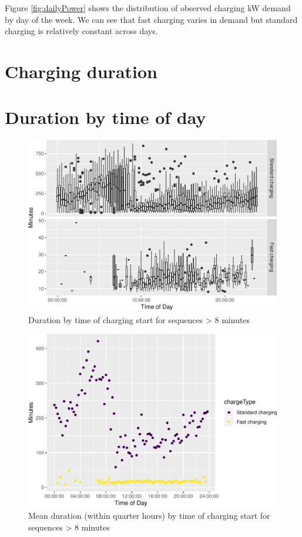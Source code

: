 \documentclass[]{article}
\begin{document}
Figure \ref{fig:dailyPower} shows the distribution of observed charging
kW demand by day of the week. We can see that fast charging varies in
demand but standard charging is relatively constant across days.

\section{Charging duration}\label{duration}

\section{Duration by time of day}\label{duration-by-time-of-day}

\begin{figure}
\centering
\includegraphics{EVBB_report_files/figure-latex/durationTimeBox-1.pdf}
\caption{\label{fig:durationTimeBox}Duration by time of charging start for
sequences \textgreater{} 8 minutes}
\end{figure}

\begin{figure}
\centering
\includegraphics{EVBB_report_files/figure-latex/durationTimeMean-1.pdf}
\caption{\label{fig:durationTimeMean}Mean duration (within quarter hours) by
time of charging start for sequences \textgreater{} 8 minutes}
\end{figure}
\end{document}
